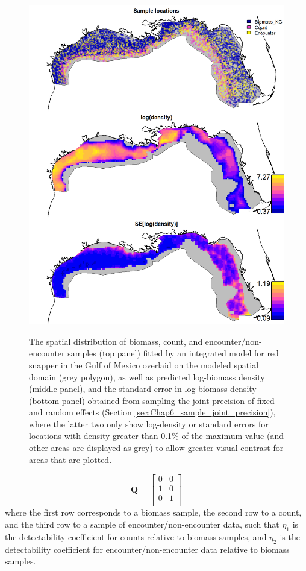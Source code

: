 \begin{figure}[!ht]
    \caption[Predicted density of red snapper from an integrated model]{The spatial distribution of biomass, count, and encounter/non-encounter samples (top panel) fitted by an integrated model for red snapper in the Gulf of Mexico overlaid on the modeled spatial domain (grey polygon), as well as predicted log-biomass density (middle panel), and the standard error in log-biomass density (bottom panel) obtained from sampling the joint precision of fixed and random effects (Section \ref{sec:Chap6_sample_joint_precision}), where the latter two only show log-density or standard errors for locations with density greater than 0.1\% of the maximum value (and other areas are displayed as grey) to allow greater visual contrast for areas that are plotted.}
    \centering
    \includegraphics[width=5.5in]{Chap_7/Predicted densities.png}
    \label{fig:Chap7_predicted_densities}
\end{figure}

\begin{equation} \label{eq:Chap7_Q}
    \mathbf{Q} = \begin{bmatrix}
    0 & 0 \\
    1 & 0 \\
    0 & 1 \\
    \end{bmatrix} 
\end{equation}
where the first row corresponds to a biomass sample, the second row to a count, and the third row to a sample of encounter/non-encounter data, such that \(\eta_1\) is the detectability coefficient for counts relative to biomass samples, and \(\eta_2\) is the detectability coefficient for encounter/non-encounter data relative to biomass samples.  

